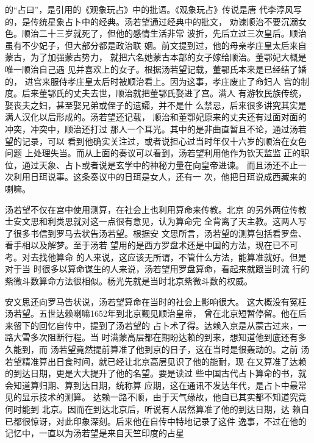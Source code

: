 的“占曰”，是引用的《观象玩占》中的批语。《观象玩占》传说是唐%
代李淳风写的，是传统星象占卜中的经典。汤若望通过经典中的批文，%
劝谏顺治不要沉溺女色。顺治二十三岁就死了，但他的感情生活非常%
波折，先后立过三次皇后。顺治虽有不少妃子，但大部分都是政治联%
姻。前文提到过，他的母亲孝庄皇太后来自蒙古，为了加强蒙古势力，%
就把六名她蒙古本部的女子嫁给顺治。董鄂妃大概是唯一顺治自己遇%
见并喜欢上的女子。根据汤若望记载，董鄂氏本来是已经结了婚的，%
进宫来服侍孝庄皇太后时被顺治看上。因为这事，孝庄废止了命妇人%
宫的制度。后来董鄂氏的丈夫去世，顺治就把董鄂氏娶进了宫。满人%
有游牧民族传统，娶丧夫之妇，甚至娶兄弟或侄子的遗孀，并不是什%
么禁忌，后来很多讲究其实是满人汉化以后形成的。汤若望还记载，%
顺治和董鄂妃原来的丈夫还有过面对面的冲突，冲突中，顺治还打过%
那人一个耳光。其中的是非曲直暂且不论，通过汤若望的记录，可以%
看到他确实关注过，或者说担心过当时年仅十六岁的顺治在女色问题%
上处理失当。而从上面的奏议可以看到，汤若望利用他作为钦天监监%
正的职位，通过天象、占卜或者说是玄学中的神秘力量在向皇帝进谏。%
而且汤还不止一次利用日珥说事。这条奏议中的日珥是女人，还有一%
次，他把日珥说成西藏来的喇嘛。%
\par
汤若望不仅在宫中使用测算，在社会上也利用算命来传教。北京%
的另外两位传教士安文思和利类思就对这一点很有意见，认为算命完%
全背离了天主教。这两人写了很多书信到罗马去状告汤若望。根据安%
文思所言，汤若望的测算包括看罗盘、看手相以及解梦。至于汤若%
望用的是西方罗盘术还是中国的方法，现在已不可考。对去找他算命%
的人来说，这应该无所谓，不管什么方法，能算准就好。但是对于当%
时很多以算命谋生的人来说，汤若望用罗盘算命，看起来就跟当时流%
行的紫微斗数算命方法很相似。杨光先就是当时北京紫微斗数的权威。%
\par
安文思还向罗马告状说，汤若望算命在当时的社会上影响很大。%
这大概没有冤枉汤若望。五世达赖喇嘛1652年到北京觐见顺治皇帝，%
曾在北京短暂停留。他在后来留下的回忆自传中，提到了汤若望的%
占卜术了得。达赖入京是从蒙古过来，一路大雪多次阻断行程。当%
时满蒙高层都在期盼达赖的到来，想知道他到底还有多久能到，而%
汤若望竟然提前算准了他到京的日子，这在当时是很轰动的。之前%
汤若望精准算出日食时间，就已经让北京高层见识了他的能耐，现%
在又算准了达赖的到达日期，更是大大提升了他的名望。要是读过%
些中国古代占卜算命的书，就会知道算归期、算到达日期，统称算%
应期，这在通讯不发达年代，是占卜中最常见的显示技术的测算。%
达赖一路不顺，由于天气缘故，他自已其实都不知道究竟何时能到%
北京。因而在到达北京后，听说有人居然算准了他的到达日期，达%
赖自已都很惊讶，对此印象深刻。后来他在自传中特地记录了这件%
逸事，不过在他的记忆中，一直以为汤若望是来自天竺印度的占星%
